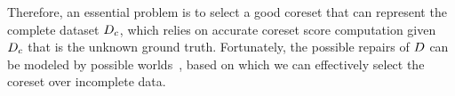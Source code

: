 %


Therefore, an essential problem is to select a good coreset that can represent the complete dataset $D_c$, which relies on accurate coreset score computation given $D_c$ that is the unknown ground truth.
%
Fortunately, the possible repairs of $D$ can be modeled by possible worlds~\cite{DBLP:journals/tods/DengFG16, DBLP:conf/pods/ArenasBC99, DBLP:series/synthesis/2011Bertossi, DBLP:conf/pods/Bertossi19}, based on which we can effectively select the coreset over incomplete data.




